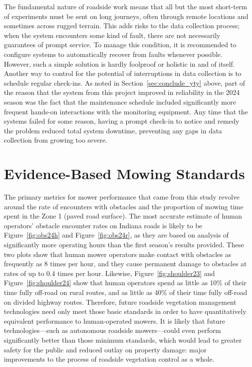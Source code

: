 \documentclass[
]{article}
\begin{document}
The fundamental nature of roadside work means that all but the most
short-term of experiments must be sent on long journeys, often through
remote locations and sometimes across rugged terrain. This adds risks to
the data collection process; when the system encounters some kind of
fault, there are not necessarily guarantees of prompt service. To manage
this condition, it is recommended to configure systems to automatically
recover from faults whenever possible. However, such a simple solution
is hardly foolproof or holistic in and of itself. Another way to control
for the potential of interruptions in data collection is to schedule
regular check-ins. As noted in Section~\ref{sec:conclude_yty} above,
part of the reason that the system from this project improved in
reliability in the 2024 season was the fact that the maintenance
schedule included significantly more frequent hands-on interactions with
the monitoring equipment. Any time that the systems failed for some
reason, having a prompt check-in to notice and remedy the problem
reduced total system downtime, preventing any gaps in data collection
from growing too severe.

\section{Evidence-Based Mowing Standards}\label{sec:conclude_mow}

The primary metrics for mower performance that came from this study
revolve around the rate of encounters with obstacles and the proportion
of mowing time spent in the Zone 1 (paved road surface). The most
accurate estimate of human operators' obstacle encounter rates on
Indiana roads is likely to be Figure~\ref{fig:obs24h} and
Figure~\ref{fig:obs24r}, as they are based on analysis of significantly
more operating hours than the first season's results provided. These two
plots show that human mower operators make contact with obstacles as
frequently as 8 times per hour, and they cause permanent damage to
obstacles at rates of up to 0.4 times per hour. Likewise,
Figure~\ref{fig:shoulder23} and Figure~\ref{fig:shoulder24} show that
human operators spend as little as 10\% of their time fully off-road on
rural routes, and as little as 40\% of their time fully off-road on
divided highway routes. Therefore, future roadside vegetation management
technologies need only meet those basic standards in order to have
quantitatively equivalent performance to human-operated mowers. It is
likely that future technologies---such as autonomous roadside
mowers---could even perform significantly better than those minimum
standards, which would lead to greater safety for the public and reduced
outlay on property damage: major improvements to the process of roadside
vegetation control as a whole.
\end{document}
